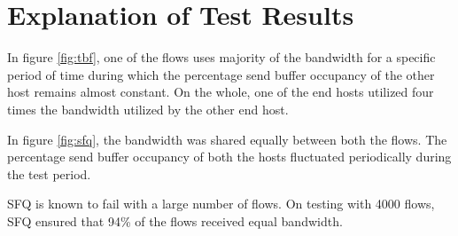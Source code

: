 \clearpage

\section{Explanation of Test Results}
In figure \ref{fig:tbf}, one of the flows uses majority of the bandwidth for a
specific period of time during which the percentage send buffer occupancy of
the other host remains almost constant. On the whole, one of the end hosts
utilized four times the bandwidth utilized by the other end host.

In figure \ref{fig:sfq}, the bandwidth was shared equally between both the
flows. The percentage send buffer occupancy of both the hosts fluctuated
periodically during the test period.

SFQ is known to fail with a large number of flows. On testing with 4000 flows,
SFQ ensured that 94\% of the flows received equal bandwidth.

